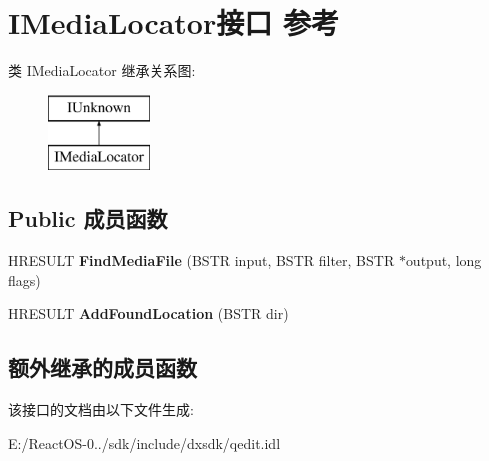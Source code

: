 \hypertarget{interface_i_media_locator}{}\section{I\+Media\+Locator接口 参考}
\label{interface_i_media_locator}
类 I\+Media\+Locator 继承关系图\+:\begin{figure}[H]
\begin{center}
\leavevmode
\includegraphics[height=2.000000cm]{interface_i_media_locator}
\end{center}
\end{figure}
\subsection*{Public 成员函数}
\begin{DoxyCompactItemize}
\item 
\mbox{\label{interface_i_media_locator_a32beff6738057e334968ca251639da20}} 
H\+R\+E\+S\+U\+LT {\bfseries Find\+Media\+File} (B\+S\+TR input, B\+S\+TR filter, B\+S\+TR $\ast$output, long flags)
\item 
\mbox{\label{interface_i_media_locator_a8282d3984b220e9fbfbe2bf09e5bc6ed}} 
H\+R\+E\+S\+U\+LT {\bfseries Add\+Found\+Location} (B\+S\+TR dir)
\end{DoxyCompactItemize}
\subsection*{额外继承的成员函数}


该接口的文档由以下文件生成\+:\begin{DoxyCompactItemize}
\item 
E\+:/\+React\+O\+S-\/0../sdk/include/dxsdk/qedit.\+idl\end{DoxyCompactItemize}
